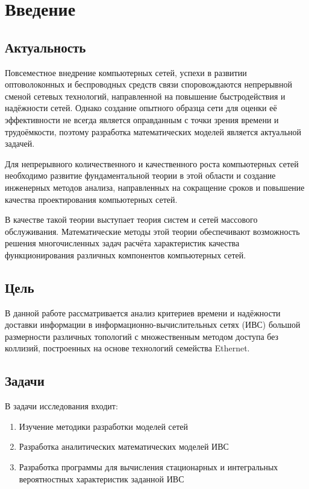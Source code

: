 \documentclass[oneside, draft, 14pt, a4paper]{extreport}
\begin{document}
\renewcommand{\contentsname}{\centering Оглавление}
\tableofcontents
\thispagestyle{empty}

\chapter*{\centering Введение}

\section*{\centering Актуальность}
Повсеместное внедрение компьютерных сетей, успехи в развитии оптоволоконных и беспроводных средств связи
споровождаются непрерывной сменой сетевых технологий, направленной на повышение быстродействия
и надёжности сетей. Однако создание опытного образца сети для оценки её эффективности не всегда является
оправданным с точки зрения времени и трудоёмкости, поэтому разработка математических моделей является актуальной задачей.

Для непрерывного количественного и качественного роста компьютерных сетей необходимо развитие фундаментальной
теории в этой области и создание инженерных методов анализа, направленных на сокращение сроков и повышение
качества проектирования компьютерных сетей.

В качестве такой теории выступает теория систем и сетей массового обслуживания.
Математические методы этой теории обеспечивают возможность решения многочисленных задач расчёта
характеристик качества функционирования различных компонентов компьютерных сетей.

\section*{\centering Цель}
В данной работе рассматривается анализ критериев времени и надёжности доставки информации в информационно-вычислительных
сетях (ИВС) большой размерности различных топологий с множественным методом доступа без коллизий,
построенных на основе технологий семейства Ethernet.

\section*{\centering Задачи}
В задачи исследования входит:
\begin{enumerate}
	\item Изучение методики разработки моделей сетей
	\item Разработка аналитических математических моделей ИВС
	\item Разработка программы для вычисления стационарных и интегральных вероятностных характеристик заданной ИВС
\end{enumerate}
\end{document}
